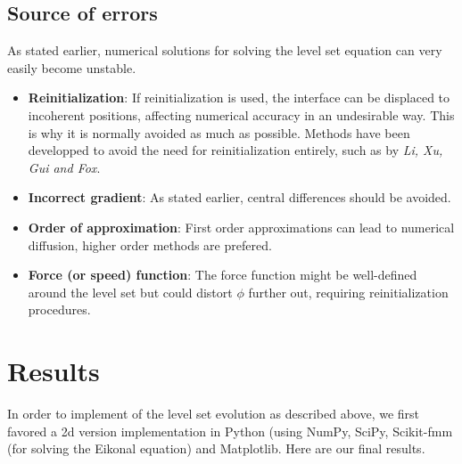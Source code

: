 \documentclass{article}
\begin{document}
\subsection{Source of errors}
As stated earlier, numerical solutions for solving the level set equation can
very easily become unstable.
\begin{itemize}
    \item \textbf{Reinitialization}: If reinitialization is used, the interface
        can be displaced to incoherent positions, affecting numerical accuracy
        in an undesirable way. This is why it is normally avoided as much as
        possible. Methods have been developped to avoid the need for
        reinitialization entirely, such as \cite{li2010distance} by \emph{Li,
        Xu, Gui and Fox}.
    \item \textbf{Incorrect gradient}: As stated earlier, central differences
        should be avoided.
    \item \textbf{Order of approximation}: First order approximations can lead
        to numerical diffusion, higher order methods are prefered.
    \item \textbf{Force (or speed) function}: The force function might be
        well-defined around the level set but could distort $\phi$
        further out, requiring reinitialization procedures. 
\end{itemize}

\section{Results}
In order to implement of the level set evolution as described above, we first
favored a 2d version implementation in Python (using NumPy, SciPy, Scikit-fmm
(for solving the Eikonal equation) and Matplotlib. Here are our final results.
\begin{figure}[H]
  \centering
  ~
   \\
  ~
   \\
   ~
\end{figure}
\end{document}
